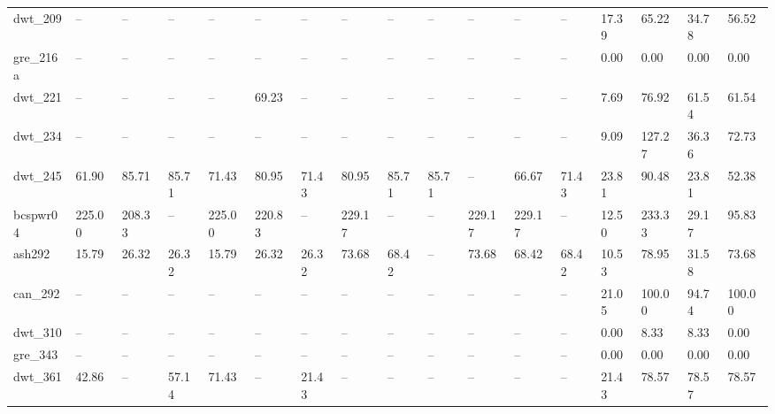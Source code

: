\begin{tabular}{lllllllllllllllll}
dwt\_209 & -- & -- & -- & -- & -- & -- & -- & -- & -- & -- & -- & -- & 17.39 & 65.22 & 34.78 & 56.52 \\
gre\_216a & -- & -- & -- & -- & -- & -- & -- & -- & -- & -- & -- & -- & 0.00 & 0.00 & 0.00 & 0.00 \\
dwt\_221 & -- & -- & -- & -- & 69.23 & -- & -- & -- & -- & -- & -- & -- & 7.69 & 76.92 & 61.54 & 61.54 \\
dwt\_234 & -- & -- & -- & -- & -- & -- & -- & -- & -- & -- & -- & -- & 9.09 & 127.27 & 36.36 & 72.73 \\
dwt\_245 & 61.90 & 85.71 & 85.71 & 71.43 & 80.95 & 71.43 & 80.95 & 85.71 & 85.71 & -- & 66.67 & 71.43 & 23.81 & 90.48 & 23.81 & 52.38 \\
bcspwr04 & 225.00 & 208.33 & -- & 225.00 & 220.83 & -- & 229.17 & -- & -- & 229.17 & 229.17 & -- & 12.50 & 233.33 & 29.17 & 95.83 \\
ash292 & 15.79 & 26.32 & 26.32 & 15.79 & 26.32 & 26.32 & 73.68 & 68.42 & -- & 73.68 & 68.42 & 68.42 & 10.53 & 78.95 & 31.58 & 73.68 \\
can\_292 & -- & -- & -- & -- & -- & -- & -- & -- & -- & -- & -- & -- & 21.05 & 100.00 & 94.74 & 100.00 \\
dwt\_310 & -- & -- & -- & -- & -- & -- & -- & -- & -- & -- & -- & -- & 0.00 & 8.33 & 8.33 & 0.00 \\
gre\_343 & -- & -- & -- & -- & -- & -- & -- & -- & -- & -- & -- & -- & 0.00 & 0.00 & 0.00 & 0.00 \\
dwt\_361 & 42.86 & -- & 57.14 & 71.43 & -- & 21.43 & -- & -- & -- & -- & -- & -- & 21.43 & 78.57 & 78.57 & 78.57 \\
\hline
\end{tabular}
